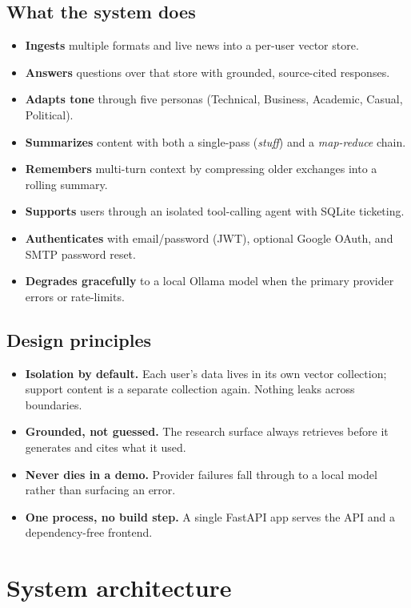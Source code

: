 \documentclass[11pt]{article}
\begin{document}
\subsection{What the system does}
\begin{itemize}
  \item \textbf{Ingests} multiple formats and live news into a per-user vector store.
  \item \textbf{Answers} questions over that store with grounded, source-cited responses.
  \item \textbf{Adapts tone} through five personas (Technical, Business, Academic, Casual, Political).
  \item \textbf{Summarizes} content with both a single-pass (\emph{stuff}) and a \emph{map-reduce} chain.
  \item \textbf{Remembers} multi-turn context by compressing older exchanges into a rolling summary.
  \item \textbf{Supports} users through an isolated tool-calling agent with SQLite ticketing.
  \item \textbf{Authenticates} with email/password (JWT), optional Google OAuth, and SMTP password reset.
  \item \textbf{Degrades gracefully} to a local Ollama model when the primary provider errors or rate-limits.
\end{itemize}

\subsection{Design principles}
\begin{itemize}
  \item \textbf{Isolation by default.} Each user's data lives in its own vector collection; support content is a separate collection again. Nothing leaks across boundaries.
  \item \textbf{Grounded, not guessed.} The research surface always retrieves before it generates and cites what it used.
  \item \textbf{Never dies in a demo.} Provider failures fall through to a local model rather than surfacing an error.
  \item \textbf{One process, no build step.} A single FastAPI app serves the API and a dependency-free frontend.
\end{itemize}

\section{System architecture}
\label{sec:arch}
\end{document}
